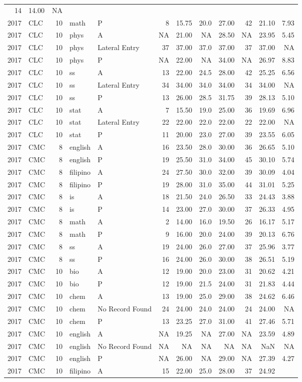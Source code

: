 \documentclass[]{article}
\begin{document}
\begin{longtable}[]{@{}rlrllrrrrrrr@{}}
14 & 14.00 & NA\tabularnewline
2017 & CLC & 10 & math & P & 8 & 15.75 & 20.0 & 27.00 & 42 & 21.10 &
7.93\tabularnewline
2017 & CLC & 10 & phys & A & NA & 21.00 & NA & 28.50 & NA & 23.95 &
5.45\tabularnewline
2017 & CLC & 10 & phys & Lateral Entry & 37 & 37.00 & 37.0 & 37.00 & 37
& 37.00 & NA\tabularnewline
2017 & CLC & 10 & phys & P & NA & 22.00 & NA & 34.00 & NA & 26.97 &
8.83\tabularnewline
2017 & CLC & 10 & ss & A & 13 & 22.00 & 24.5 & 28.00 & 42 & 25.25 &
6.56\tabularnewline
2017 & CLC & 10 & ss & Lateral Entry & 34 & 34.00 & 34.0 & 34.00 & 34 &
34.00 & NA\tabularnewline
2017 & CLC & 10 & ss & P & 13 & 26.00 & 28.5 & 31.75 & 39 & 28.13 &
5.10\tabularnewline
2017 & CLC & 10 & stat & A & 7 & 15.50 & 19.0 & 25.00 & 36 & 19.69 &
6.96\tabularnewline
2017 & CLC & 10 & stat & Lateral Entry & 22 & 22.00 & 22.0 & 22.00 & 22
& 22.00 & NA\tabularnewline
2017 & CLC & 10 & stat & P & 11 & 20.00 & 23.0 & 27.00 & 39 & 23.55 &
6.05\tabularnewline
2017 & CMC & 8 & english & A & 16 & 23.50 & 28.0 & 30.00 & 36 & 26.65 &
5.10\tabularnewline
2017 & CMC & 8 & english & P & 19 & 25.50 & 31.0 & 34.00 & 45 & 30.10 &
5.74\tabularnewline
2017 & CMC & 8 & filipino & A & 24 & 27.50 & 30.0 & 32.00 & 39 & 30.09 &
4.04\tabularnewline
2017 & CMC & 8 & filipino & P & 19 & 28.00 & 31.0 & 35.00 & 44 & 31.01 &
5.25\tabularnewline
2017 & CMC & 8 & is & A & 18 & 21.50 & 24.0 & 26.50 & 33 & 24.43 &
3.88\tabularnewline
2017 & CMC & 8 & is & P & 14 & 23.00 & 27.0 & 30.00 & 37 & 26.33 &
4.95\tabularnewline
2017 & CMC & 8 & math & A & 2 & 14.00 & 16.0 & 19.50 & 26 & 16.17 &
5.17\tabularnewline
2017 & CMC & 8 & math & P & 9 & 16.00 & 20.0 & 24.00 & 39 & 20.13 &
6.76\tabularnewline
2017 & CMC & 8 & ss & A & 19 & 24.00 & 26.0 & 27.00 & 37 & 25.96 &
3.77\tabularnewline
2017 & CMC & 8 & ss & P & 16 & 24.00 & 26.0 & 30.00 & 38 & 26.51 &
5.19\tabularnewline
2017 & CMC & 10 & bio & A & 12 & 19.00 & 20.0 & 23.00 & 31 & 20.62 &
4.21\tabularnewline
2017 & CMC & 10 & bio & P & 12 & 19.00 & 21.5 & 24.00 & 31 & 21.83 &
4.44\tabularnewline
2017 & CMC & 10 & chem & A & 13 & 19.00 & 25.0 & 29.00 & 38 & 24.62 &
6.46\tabularnewline
2017 & CMC & 10 & chem & No Record Found & 24 & 24.00 & 24.0 & 24.00 &
24 & 24.00 & NA\tabularnewline
2017 & CMC & 10 & chem & P & 13 & 23.25 & 27.0 & 31.00 & 41 & 27.46 &
5.71\tabularnewline
2017 & CMC & 10 & english & A & NA & 19.25 & NA & 27.00 & NA & 23.59 &
4.89\tabularnewline
2017 & CMC & 10 & english & No Record Found & NA & NA & NA & NA & NA &
NaN & NA\tabularnewline
2017 & CMC & 10 & english & P & NA & 26.00 & NA & 29.00 & NA & 27.39 &
4.27\tabularnewline
2017 & CMC & 10 & filipino & A & 15 & 22.00 & 25.0 & 28.00 & 37 & 24.92

\end{longtable}
\end{document}

